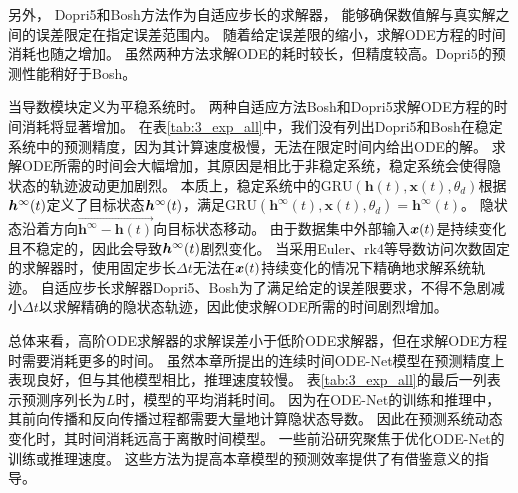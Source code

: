 另外，
Dopri5和Bosh方法作为自适应步长的求解器，
能够确保数值解与真实解之间的误差限定在指定误差范围内。
随着给定误差限的缩小，求解ODE方程的时间消耗也随之增加。
虽然两种方法求解ODE的耗时较长，但精度较高。Dopri5的预测性能稍好于Bosh。


当导数模块定义为平稳系统时。
两种自适应方法Bosh和Dopri5求解ODE方程的时间消耗将显著增加。
在表\ref{tab:3_exp_all}中，我们没有列出Dopri5和Bosh在稳定系统中的预测精度，因为其计算速度极慢，无法在限定时间内给出ODE的解。
求解ODE所需的时间会大幅增加，其原因是相比于非稳定系统，稳定系统会使得隐状态的轨迹波动更加剧烈。
本质上，稳定系统中的$\text{GRU}\left(\mathbf{h}(t), \mathbf{x}(t), \theta_{d}\right)$根据$\boldsymbol h^{\infty}(t)$定义了目标状态$\boldsymbol h^{\infty}(t)$，满足$\text{GRU}\left(\mathbf{h}^{\infty}(t), \mathbf{x}(t), \theta_{d}\right)=\mathbf{h}^{\infty}(t)$。
隐状态沿着方向$\overrightarrow{\mathbf{h}^\infty-\mathbf h(t)}$向目标状态移动。
由于数据集中外部输入$\boldsymbol x(t)$是持续变化且不稳定的，因此会导致$\boldsymbol h^{\infty}(t)$剧烈变化。
当采用Euler、rk4等导数访问次数固定的求解器时，使用固定步长$\Delta t$无法在$\boldsymbol x(t)$持续变化的情况下精确地求解系统轨迹。
自适应步长求解器Dopri5、Bosh为了满足给定的误差限要求，不得不急剧减小$\Delta t$以求解精确的隐状态轨迹，因此使求解ODE所需的时间剧烈增加。

总体来看，高阶ODE求解器的求解误差小于低阶ODE求解器，但在求解ODE方程时需要消耗更多的时间。
虽然本章所提出的连续时间ODE-Net模型在预测精度上表现良好，但与其他模型相比，推理速度较慢。
表\ref{tab:3_exp_all}的最后一列表示预测序列长为$L$时，模型的平均消耗时间。
因为在ODE-Net的训练和推理中，其前向传播和反向传播过程都需要大量地计算隐状态导数。
因此在预测系统动态变化时，其时间消耗远高于离散时间模型。
一些前沿研究\cite{J2020,poli2020,kelly2020}聚焦于优化ODE-Net的训练或推理速度。
这些方法为提高本章模型的预测效率提供了有借鉴意义的指导。


